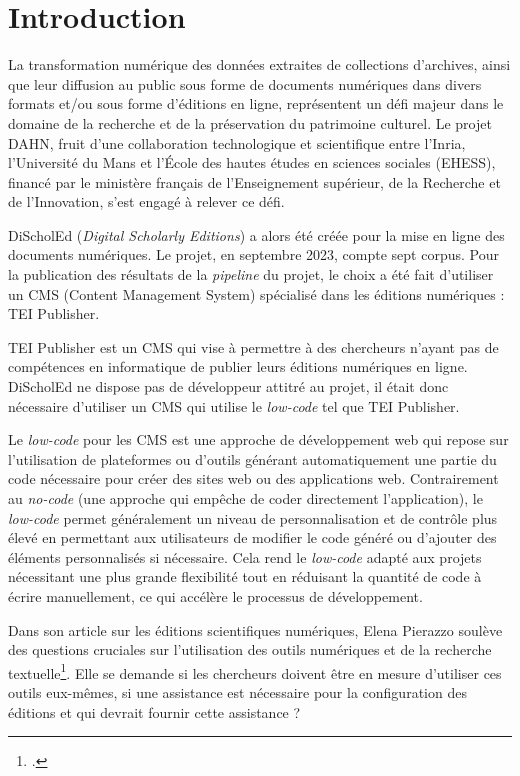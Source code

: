 \chapter*{Introduction}

La transformation numérique des données extraites de collections d'archives, ainsi que leur diffusion au public sous forme de documents numériques dans divers formats et/ou sous forme d'éditions en ligne, représentent un défi majeur dans le domaine de la recherche et de la préservation du patrimoine culturel. Le projet DAHN, fruit d'une collaboration technologique et scientifique entre l'Inria, l'Université du Mans et l'École des hautes études en sciences sociales (EHESS), financé par le ministère français de l'Enseignement supérieur, de la Recherche et de l'Innovation, s'est engagé à relever ce défi.

DiScholEd (\textit{Digital Scholarly Editions}) a alors été créée pour la mise en ligne des documents numériques. Le projet, en septembre 2023, compte sept corpus. Pour la publication des résultats de la \textit{pipeline} du projet, le choix a été fait d'utiliser un CMS (Content Management System) spécialisé dans les éditions numériques : TEI Publisher.

TEI Publisher est un CMS qui vise à permettre à des chercheurs n'ayant pas de compétences en informatique de publier leurs éditions numériques en ligne. DiScholEd ne dispose pas de développeur attitré au projet, il était donc nécessaire d'utiliser un CMS qui utilise le \textit{low-code} tel que TEI Publisher.

Le \textit{low-code} pour les CMS est une approche de développement web qui repose sur l'utilisation de plateformes ou d'outils générant automatiquement une partie du code nécessaire pour créer des sites web ou des applications web. Contrairement au \textit{no-code} (une approche qui empêche de coder directement l'application), le \textit{low-code} permet généralement un niveau de personnalisation et de contrôle plus élevé en permettant aux utilisateurs de modifier le code généré ou d'ajouter des éléments personnalisés si nécessaire. Cela rend le \textit{low-code} adapté aux projets nécessitant une plus grande flexibilité tout en réduisant la quantité de code à écrire manuellement, ce qui accélère le processus de développement.

Dans son article sur les éditions scientifiques numériques, Elena Pierazzo soulève des questions cruciales sur l'utilisation des outils numériques et de la recherche textuelle\footcite{pierazzo:hal-02117714}. Elle se demande si les chercheurs doivent être en mesure d'utiliser ces outils eux-mêmes, si une assistance est nécessaire pour la configuration des éditions et qui devrait fournir cette assistance ?

